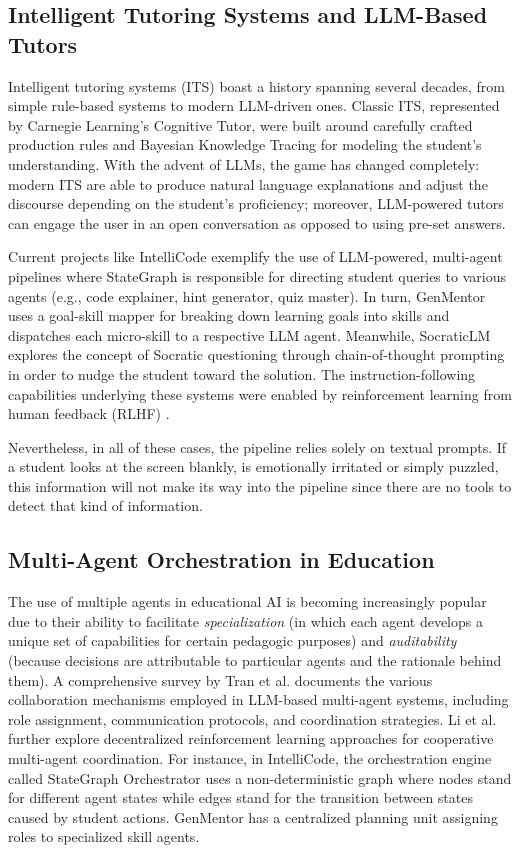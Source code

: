\documentclass[conference, letterpaper]{IEEEtran}
\begin{document}
\subsection{Intelligent Tutoring Systems and LLM-Based Tutors}

Intelligent tutoring systems (ITS) boast a history spanning several decades, from simple rule-based systems to modern LLM-driven ones. Classic ITS, represented by Carnegie Learning's Cognitive Tutor, were built around carefully crafted production rules and Bayesian Knowledge Tracing for modeling the student’s understanding. With the advent of LLMs, the game has changed completely: modern ITS are able to produce natural language explanations and adjust the discourse depending on the student’s proficiency; moreover, LLM-powered tutors can engage the user in an open conversation as opposed to using pre-set answers.

Current projects like IntelliCode \cite{intellicode2025} exemplify the use of LLM-powered, multi-agent pipelines where StateGraph is responsible for directing student queries to various agents (e.g., code explainer, hint generator, quiz master). In turn, GenMentor \cite{genmentor2025} uses a goal-skill mapper for breaking down learning goals into skills and dispatches each micro-skill to a respective LLM agent. Meanwhile, SocraticLM explores the concept of Socratic questioning through chain-of-thought prompting in order to nudge the student toward the solution. The instruction-following capabilities underlying these systems were enabled by reinforcement learning from human feedback (RLHF) \cite{ouyang2022}.

Nevertheless, in all of these cases, the pipeline relies solely on textual prompts. If a student looks at the screen blankly, is emotionally irritated or simply puzzled, this information will not make its way into the pipeline since there are no tools to detect that kind of information.

\subsection{Multi-Agent Orchestration in Education}

The use of multiple agents in educational AI is becoming increasingly popular due to their ability to facilitate \emph{specialization} (in which each agent develops a unique set of capabilities for certain pedagogic purposes) and \emph{auditability} (because decisions are attributable to particular agents and the rationale behind them). A comprehensive survey by Tran et al. \cite{tran2025} documents the various collaboration mechanisms employed in LLM-based multi-agent systems, including role assignment, communication protocols, and coordination strategies. Li et al. \cite{li2020} further explore decentralized reinforcement learning approaches for cooperative multi-agent coordination. For instance, in IntelliCode, the orchestration engine called StateGraph Orchestrator uses a non-deterministic graph where nodes stand for different agent states while edges stand for the transition between states caused by student actions. GenMentor has a centralized planning unit assigning roles to specialized skill agents.
\end{document}
